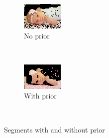 \documentclass[12pt]{article}
\begin{document}
\begin{figure}
        \centering
        \begin{subfigure}[b]{0.3\textwidth}
                \includegraphics[width=\textwidth]{results/esther_0_1.png}
                \caption{No prior}
                \label{fig:esther_0}
        \end{subfigure}%
        ~ %
        \begin{subfigure}[b]{0.3\textwidth}
                \includegraphics[width=\textwidth]{results/esther_3_0.png}
                \caption{With prior}
                \label{fig:esther_1}
        \end{subfigure}
        ~ %
        \caption{Segments with and without prior}\label{fig:esthers}
\end{figure}
\end{document}
